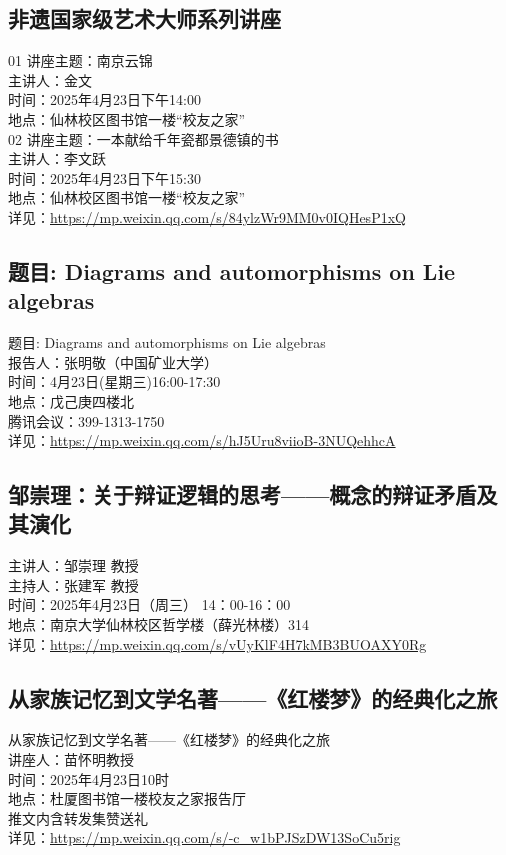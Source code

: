 \documentclass[letterpaper, 12pt]{article}
\begin{document}
\begin{multicols}{2}
\subsection{非遗国家级艺术大师系列讲座} %
01 讲座主题：南京云锦 
\\主讲人：金文
\\时间：2025年4月23日下午14:00
\\地点：仙林校区图书馆一楼“校友之家”
\\02 讲座主题：一本献给千年瓷都景德镇的书
\\主讲人：李文跃
\\时间：2025年4月23日下午15:30
\\地点：仙林校区图书馆一楼“校友之家”
\\详见：\url{https://mp.weixin.qq.com/s/84ylzWr9MM0v0IQHesP1xQ}

\subsection{题目: Diagrams and automorphisms on Lie algebras} %
题目: Diagrams and automorphisms on Lie algebras
\\报告人：张明敬（中国矿业大学）
\\时间：4月23日(星期三)16:00-17:30
\\地点：戊己庚四楼北
\\腾讯会议：399-1313-1750
\\详见：\url{https://mp.weixin.qq.com/s/hJ5Uru8viioB-3NUQehhcA}

\subsection{邹崇理：关于辩证逻辑的思考——概念的辩证矛盾及其演化} %
主讲人：邹崇理 教授
\\主持人：张建军 教授
\\时间：2025年4月23日（周三） 14：00-16：00
\\地点：南京大学仙林校区哲学楼（薛光林楼）314
\\详见：\url{https://mp.weixin.qq.com/s/vUyKlF4H7kMB3BUOAXY0Rg}

\subsection{从家族记忆到文学名著——《红楼梦》的经典化之旅} %
从家族记忆到文学名著——《红楼梦》的经典化之旅
\\讲座人：苗怀明教授
\\时间：2025年4月23日10时
\\地点：杜厦图书馆一楼校友之家报告厅
\\推文内含转发集赞送礼
\\详见：\url{https://mp.weixin.qq.com/s/-c_w1bPJSzDW13SoCu5rig}


\end{multicols}
\end{document}
